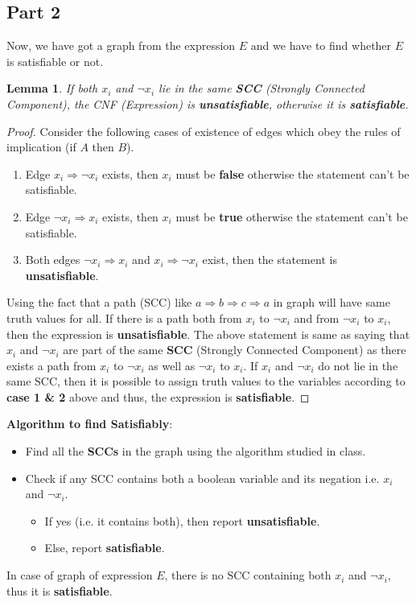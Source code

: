 \documentclass{article}
\let\bold\textbf
\newtheorem{lemma}{Lemma}[section]
\begin{document}
{  \subsection{Part 2}{
    Now, we have got a graph from the expression $E$ and we have to find whether $E$ is satisfiable or not.
    \begin{lemma}
      If both $x_i$ and $\neg x_i$ lie in the same \bold{SCC} (Strongly Connected Component), the CNF (Expression) is \bold{unsatisfiable}, otherwise it is \bold{satisfiable}.
    \end{lemma}
    \begin{proof}
      Consider the following cases of existence of edges which obey the rules of implication (if $A$ then $B$).
      \begin{enumerate}
        \item{Edge $x_i\Rightarrow \neg x_i$ exists, then $x_i$ must be \bold{false} otherwise the statement can't be satisfiable.}
        \item{Edge $\neg x_i\Rightarrow x_i$ exists, then $x_i$ must be \bold{true} otherwise the statement can't be satisfiable.}
        \item{Both edges $\neg x_i\Rightarrow x_i$ and $x_i\Rightarrow \neg x_i$ exist, then the statement is \bold{unsatisfiable}.}
      \end{enumerate}
      Using the fact that a path (SCC) like $a \Rightarrow b \Rightarrow c \Rightarrow a$ in graph will have same truth values for all. \newline
      If there is a path both from $x_i$ to $\neg x_i$ and from $\neg x_i$ to $x_i$, then the expression is \bold{unsatisfiable}. \newline
      The above statement is same as saying that $x_i$ and $\neg x_i$ are part of the same \bold{SCC} (Strongly Connected Component) as there exists a path from $x_i$ to $\neg x_i$ as well as $\neg x_i$ to $x_i$. \newline
      If $x_i$ and $\neg x_i$ do not lie in the same SCC, then it is possible to assign truth values to the variables according to \bold{case 1 \& 2} above and thus, the expression is \bold{satisfiable}.
    \end{proof}
    \noindent\bold{Algorithm to find Satisfiably}:
    \begin{itemize}
      \item{Find all the \bold{SCCs} in the graph using the algorithm studied in class.}
      \item{Check if any SCC contains both a boolean variable and its negation i.e. $x_i$ and $\neg x_i$.}
        \begin{itemize}
          \item{If yes (i.e. it contains both), then report \bold{unsatisfiable}.}
          \item{Else, report \bold{satisfiable}.}
        \end{itemize}
    \end{itemize}
    In case of graph of expression $E$, there is no SCC containing both $x_i$ and $\neg x_i$, thus it is \bold{satisfiable}.
  }
}
\end{document}
